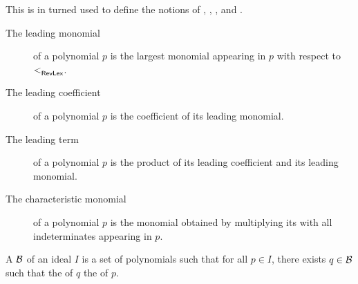 This is in turned used to define the notions of ,
, , and .
\begin{description}
    \item[The leading monomial] of a polynomial $p$ is the largest monomial
        appearing in $p$ with respect to $<_{\mathsf{RevLex}}^{}$.
    \item[The leading coefficient] of a polynomial $p$ is the coefficient of
        its leading monomial.
    \item[The leading term] of a polynomial $p$ is the product of its leading
        coefficient and its leading monomial.
    \item[The characteristic monomial] of a polynomial $p$ is the monomial
        obtained by multiplying its  with all indeterminates
        appearing in $p$.
\end{description}

A  $\Basis$ of an ideal $I$ is a set of polynomials such
that for all $p \in I$, there exists $q \in \Basis$ such that the  of $q$  the  of $p$.

